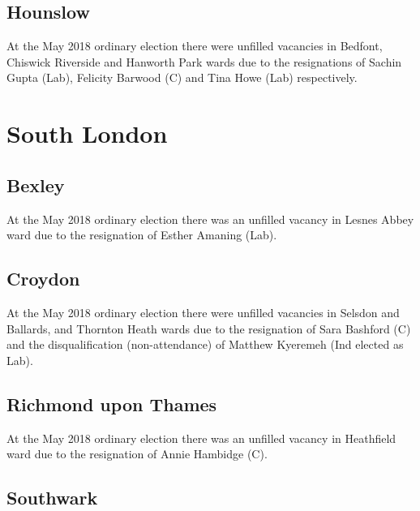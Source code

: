 \documentclass[a4paper,openany]{book}
\begin{document}
\begin{resultsiii}
\subsection*{Hounslow}

At the May 2018 ordinary election there were unfilled vacancies in Bedfont, Chiswick Riverside and Hanworth Park wards due to the resignations of Sachin Gupta (Lab), Felicity Barwood (C) and Tina Howe (Lab) respectively.

\section{South London}

\subsection*{Bexley}

At the May 2018 ordinary election there was an unfilled vacancy in Lesnes Abbey ward due to the resignation of Esther Amaning (Lab).

\subsection*{Croydon}

At the May 2018 ordinary election there were unfilled vacancies in Selsdon and Ballards, and Thornton Heath wards due to the resignation of Sara Bashford (C) and the disqualification (non-attendance) of Matthew Kyeremeh (Ind elected as Lab).

\subsection*{Richmond upon Thames}

At the May 2018 ordinary election there was an unfilled vacancy in Heathfield ward due to the resignation of Annie Hambidge (C).

\subsection*{Southwark}


\end{resultsiii}
\end{document}
